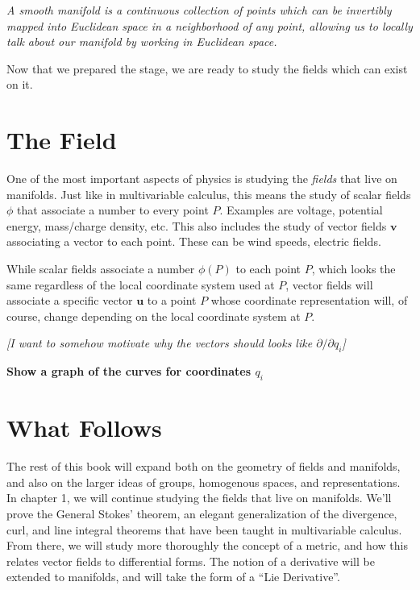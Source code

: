 	
	\begin{concept}
	\textit{A smooth manifold is a continuous collection of points which can be invertibly mapped into Euclidean space in a neighborhood of any point, allowing us to locally talk about our manifold by working in Euclidean space.}
	\end{concept}

	Now that we prepared the stage, we are ready to study the fields which can exist on it.  
	
	
	
	\section{The Field} %
	\label{sec:the_field}
	
	One of the most important aspects of physics is studying the \emph{fields} that live on manifolds. Just like in multivariable calculus, this means the study of scalar fields $\phi$ that associate a number to every point $P$. Examples are voltage, potential energy, mass/charge density, etc. This also includes the study of vector fields $\mathbf v$ associating a vector to each point. These can be wind speeds, electric fields. 
	
	While scalar fields associate a number $\phi(P)$ to each point $P$, which looks the same regardless of the local coordinate system used at $P$, vector fields will associate a specific vector $\mathbf u$ to a point $P$ whose coordinate representation will, of course, change depending on the local coordinate system at $P$.
	
	
	
	{\emph{[I want to somehow motivate why the vectors should looks like $\partial/\partial q_i$]}}
	
	\textbf{Show a graph of the curves for coordinates $q_i$}
	
	\section{What Follows} %
	\label{sec:what_follows}
	
	The rest of this book will expand both on the geometry of fields and manifolds, and also on the larger ideas of groups, homogenous spaces, and representations. \\
	
	In chapter 1, we will continue studying the fields that live on manifolds. We'll prove the General Stokes' theorem, an elegant generalization of the divergence, curl, and line integral theorems that have been taught in multivariable calculus. From there, we will study more thoroughly the concept of a metric, and how this relates vector fields to differential forms. The notion of a derivative will be extended to manifolds, and will take the form of a ``Lie Derivative''.\\
	
